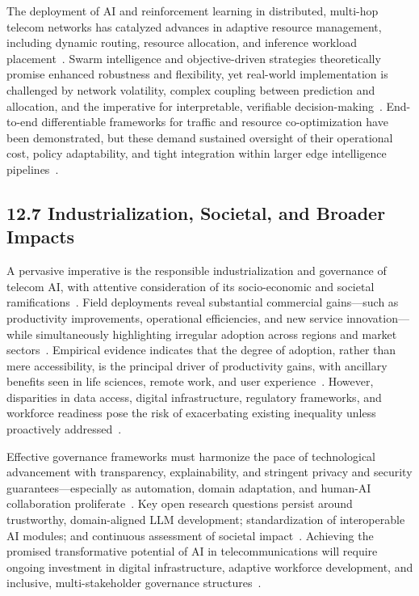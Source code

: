 \documentclass[11pt]{article}
\begin{document}
The deployment of AI and reinforcement learning in distributed, multi-hop telecom networks has catalyzed advances in adaptive resource management, including dynamic routing, resource allocation, and inference workload placement~\cite{48}. Swarm intelligence and objective-driven strategies theoretically promise enhanced robustness and flexibility, yet real-world implementation is challenged by network volatility, complex coupling between prediction and allocation, and the imperative for interpretable, verifiable decision-making~\cite{48}. End-to-end differentiable frameworks for traffic and resource co-optimization have been demonstrated, but these demand sustained oversight of their operational cost, policy adaptability, and tight integration within larger edge intelligence pipelines~\cite{48}.

\subsection{12.7 Industrialization, Societal, and Broader Impacts}

A pervasive imperative is the responsible industrialization and governance of telecom AI, with attentive consideration of its socio-economic and societal ramifications~\cite{6,8,19,26,29,49}. Field deployments reveal substantial commercial gains—such as productivity improvements, operational efficiencies, and new service innovation—while simultaneously highlighting irregular adoption across regions and market sectors~\cite{6,8,29}. Empirical evidence indicates that the degree of adoption, rather than mere accessibility, is the principal driver of productivity gains, with ancillary benefits seen in life sciences, remote work, and user experience~\cite{6,19}. However, disparities in data access, digital infrastructure, regulatory frameworks, and workforce readiness pose the risk of exacerbating existing inequality unless proactively addressed~\cite{8,19}.

Effective governance frameworks must harmonize the pace of technological advancement with transparency, explainability, and stringent privacy and security guarantees—especially as automation, domain adaptation, and human-AI collaboration proliferate~\cite{19,26,49}. Key open research questions persist around trustworthy, domain-aligned LLM development; standardization of interoperable AI modules; and continuous assessment of societal impact~\cite{26,49}. Achieving the promised transformative potential of AI in telecommunications will require ongoing investment in digital infrastructure, adaptive workforce development, and inclusive, multi-stakeholder governance structures~\cite{8,26,29,49}.
\end{document}
